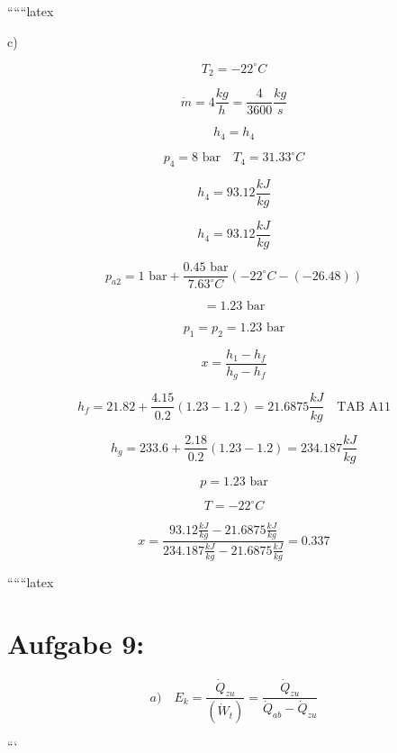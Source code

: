 ``````latex


c)

\[
T_2 = -22^\circ C
\]

\[
\dot{m} = 4 \frac{kg}{h} = \frac{4}{3600} \frac{kg}{s}
\]


\[
h_4 = h_4
\]

\[
p_4 = 8 \text{ bar} \quad T_4 = 31.33^\circ C
\]

\[
h_4 = 93.12 \frac{kJ}{kg}
\]

\[
h_4 = 93.12 \frac{kJ}{kg}
\]

\[
p_{a2} = 1 \text{ bar} + \frac{0.45 \text{ bar}}{7.63^\circ C} (-22^\circ C - (-26.48))
\]

\[
= 1.23 \text{ bar}
\]

\[
p_1 = p_2 = 1.23 \text{ bar}
\]

\[
x = \frac{h_1 - h_f}{h_g - h_f}
\]

\[
h_f = 21.82 + \frac{4.15}{0.2} (1.23 - 1.2) = 21.6875 \frac{kJ}{kg} \quad \text{TAB A11}
\]

\[
h_g = 233.6 + \frac{2.18}{0.2} (1.23 - 1.2) = 234.187 \frac{kJ}{kg}
\]

\[
p = 1.23 \text{ bar}
\]

\[
T = -22^\circ C
\]

\[
x = \frac{93.12 \frac{kJ}{kg} - 21.6875 \frac{kJ}{kg}}{234.187 \frac{kJ}{kg} - 21.6875 \frac{kJ}{kg}} = 0.337
\]

``````latex


\section*{Aufgabe 9:}

\begin{equation*}
a) \quad E_k = \frac{\dot{Q}_{zu}}{(\dot{W}_t)} = \frac{\dot{Q}_{zu}}{\dot{Q}_{ab} - \dot{Q}_{zu}}
\end{equation*}

```